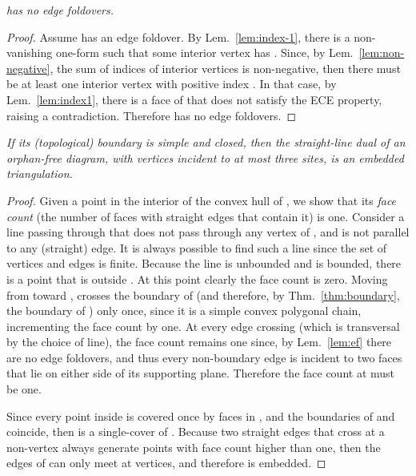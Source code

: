 \documentclass[11pt]{article}
\begin{document}
\emph{
 has no edge foldovers. }
\begin{proof}
Assume  has an edge foldover. 
By Lem.~\ref{lem:index-1}, there is a non-vanishing one-form
 such that some interior vertex  has . 
Since, by Lem.~\ref{lem:non-negative}, the sum of indices of interior vertices is
non-negative,
then there must be
at least one interior vertex  with positive index
. In that case, by Lem.~\ref{lem:index1}, there is a face of  that does not satisfy the
ECE property, raising a contradiction. 
Therefore  has no edge foldovers. 
\end{proof}







\emph{
If its (topological) boundary is simple and closed, then the straight-line dual  of an orphan-free diagram, with vertices incident to at most three sites, is an embedded triangulation. 
}
\begin{proof}


Given a point  in
the interior of the convex hull of , we show that its \emph{face count}
(the number of faces with straight edges that contain it) is one. 
Consider a line  passing through  that does not pass through any vertex of
, and is not parallel to any (straight) edge. 
It is always possible to find such a line since the set of vertices and edges is finite. 
Because the line is unbounded and  is bounded, there is a
point  that is outside . At this point clearly the
face count is zero. 
Moving from  toward ,  crosses the boundary of 
(and therefore, by Thm.~\ref{thm:boundary}, the boundary of ) 
only once, since it is a simple convex polygonal chain, incrementing the face
count by one. At every edge crossing (which is transversal by the choice of
line), the face count remains one since, by Lem.~\ref{lem:ef} there are no
edge foldovers, and thus every non-boundary edge is incident to two faces
that lie on either side of its supporting plane. Therefore the face count at
 must be one. 


Since every point inside  is covered once by faces in
,
and the boundaries of  and  coincide, then
 is a single-cover
of . 
Because two straight edges that cross at a non-vertex always generate points with
face count higher than one, then the edges of  can only meet at vertices, and
therefore  is embedded. 
\end{proof}
\end{document}
